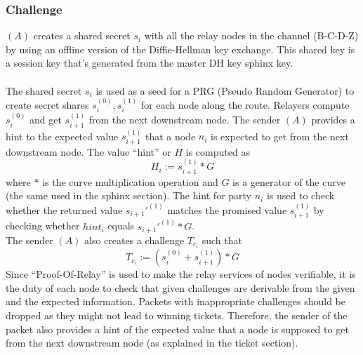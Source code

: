 \subsubsection{Challenge}
$(A)$ creates a shared secret $s_i$ with all the relay nodes in the channel (B-C-D-Z) by using an offline version of the Diffie-Hellman key exchange. This shared key is a session key that's generated from the master DH key sphinx key.
    \\~\\ The shared secret $s_i$ is used as a seed for a PRG (Pseudo Random Generator) to create secret shares $s_i^{(0)},s_i^{(1)}$ for each node along the route.
    Relayers compute $s_i^{(0)}$ and get $s_{i+1}^{(1)}$ from the next downstream node.
    \newline The sender $(A)$ provides a hint to the expected value $s_{i+1}^{(1)}$ that a node $n_i$ is expected to get from the next downstream node.
    The value “hint” or $H$ is computed as $$H_i:=s_{i+1}^{(1)}*G$$ where $*$ is the curve multiplication operation and $G$ is a generator of the curve (the same used in the sphinx section). 
    \newline The hint for party $n_i$ is used to check whether the returned value $s_{i+1}'^{(1)}$ matches the promised value $s_{i+1}^{(1)}$ by checking whether $hint_i$ equals $s_{i+1}'^{(1)}*G$. 
   \\The sender $(A)$ also creates a challenge $T_{c_i}$ such that $$T_{c_i}:=(s_i^{(0)}+s_{i+1}^{(1)})*G$$ 
   Since “Proof-Of-Relay” is used to make the relay services of nodes verifiable, it is the duty of each node to check that given challenges are derivable from the given and the expected information.
Packets with inappropriate challenges should be dropped as they might not lead to winning tickets.
Therefore, the sender of the packet also provides a hint of the expected value that a node is supposed to get from the next downstream node (as explained in the ticket section).
